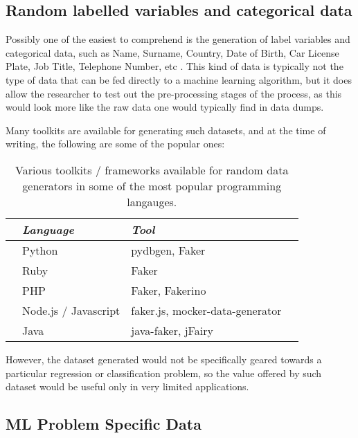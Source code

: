 \subsection{Random labelled variables and categorical data} 

Possibly one of the easiest to comprehend is the generation of label variables and categorical data, such as Name, Surname, Country, Date of Birth, Car License Plate, Job Title, Telephone Number, etc \citep{Sarkar2018}. This kind of data is typically not the type of data that can be fed directly to a machine learning algorithm, but it does allow the researcher to test out the pre-processing stages of the process, as this would look more like the raw data one would typically find in data dumps.

Many toolkits are available for generating such datasets, and at the time of writing, the following are some of the popular ones:

\begin{table}[ht]
    \centering
    \selectfont
    \begin{tabular}{llll}
      \toprule
                        & \textit{Language} & \textit{Tool} \\
      \midrule
      \textit & Python              & pydbgen, Faker  \\
      \textit & Ruby               & Faker  \\
      \textit & PHP               & Faker, Fakerino \\
      \textit & Node.js / Javascript               & faker.js, mocker-data-generator \\
      \textit & Java               & java-faker, jFairy \\
      \bottomrule
    \end{tabular}
    \caption{Various toolkits / frameworks available for random data generators in some of the most popular programming langauges.}
    \label{tab:sf_randdatagen}
\end{table}
\vspace{2mm}

However, the dataset generated would not be specifically geared towards a particular regression or classification problem, so the value offered by such dataset would be useful only in very limited applications.

\subsection{ML Problem Specific Data} 

